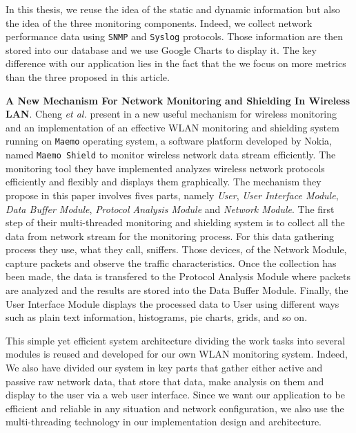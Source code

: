 In this thesis, we reuse the idea of the static and dynamic information but also the idea of the three monitoring components. Indeed, we collect network performance data using \texttt{SNMP} and \texttt{Syslog} protocols. Those information are then stored into our database and we use Google Charts to display it. The key difference with our application lies in the fact that the we focus on more metrics than the three proposed in this article.


\textbf{A New Mechanism For Network Monitoring and Shielding In Wireless LAN}. Cheng \textit{et al.} present in \cite{article2} a new useful mechanism for wireless monitoring and an implementation of an effective WLAN monitoring and shielding system running on \texttt{Maemo} operating system, a software platform developed by Nokia, named \texttt{Maemo Shield} to monitor wireless network data stream efficiently. The monitoring tool they have implemented analyzes wireless network protocols efficiently and flexibly and displays them graphically. The mechanism they propose in this paper involves fives parts, namely \textit{User}, \textit{User Interface Module}, \textit{Data Buffer Module}, \textit{Protocol Analysis Module} and \textit{Network Module}. The first step of their multi-threaded monitoring and shielding system is to collect all the data from network stream for the monitoring process. For this data gathering process they use, what they call, sniffers. Those devices, of the Network Module, capture packets and observe the traffic characteristics. Once the collection has been made, the data is transfered to the Protocol Analysis Module where packets are analyzed and the results are stored into the Data Buffer Module. Finally, the User Interface Module displays the processed data to User using different ways such as plain text information, histograms, pie charts, grids, and so on.

This simple yet efficient system architecture dividing the work tasks into several modules is reused and developed for our own WLAN monitoring system. Indeed, We also have divided our system in key parts that gather either active and passive raw network data, that store that data, make analysis on them and display to the user via a web user interface. Since we want our application to be efficient and reliable in any situation and network configuration, we also use the multi-threading technology in our implementation design and architecture.


